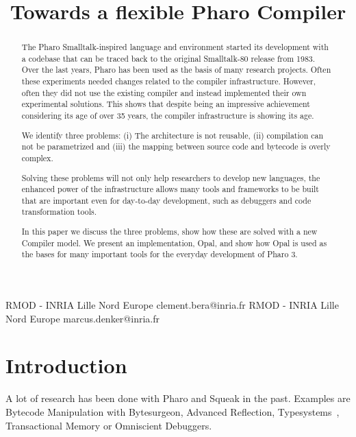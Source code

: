 \documentclass[preprint,10pt]{sigplanconf}
\begin{document}
\copyrightdata{[to be supplied]} 
 
\title{Towards a flexible Pharo Compiler}

           {RMOD - INRIA Lille Nord Europe}
           {clement.bera@inria.fr}
           {RMOD - INRIA Lille Nord Europe}
           {marcus.denker@inria.fr}

\maketitle


\begin{abstract}
The Pharo Smalltalk-inspired language and environment started its development with a codebase that can be traced back to the original Smalltalk-80 release from 1983.
Over the last years, Pharo has been used as the basis of many research projects. Often these experiments needed changes related to the compiler infrastructure. However, often they did not use the existing compiler and instead implemented their own experimental solutions.
This shows that despite being an impressive achievement considering its age of over 35 years, the compiler infrastructure is showing its age. 

We identify three problems: (i) The architecture is not reusable, (ii) compilation can not be parametrized and (iii) the mapping between source code and bytecode is overly complex.

Solving these problems will not only help researchers to develop new languages, the enhanced power of the infrastructure allows many tools and frameworks to be built that are important even for day-to-day development, such as debuggers and code transformation tools.

In this paper we discuss the three problems, show how these are solved with a new Compiler model. We present an implementation, Opal, and show how Opal is used as the bases for many important tools for the everyday development of Pharo 3.
\end{abstract}


\section{Introduction}
\label{sec:intro}

A lot of research has been done with Pharo and Squeak in the past. Examples are Bytecode Manipulation with Bytesurgeon\cite{Denk06a}, Advanced  Reflection\cite{Denk07b, Roet08a, Denk08b},
Typesystems~\cite{Hald09a}, Transactional Memory\cite{Reng09a} or Omniscient Debuggers\cite{Hofe06a, Lien08b}. 
\end{document}
